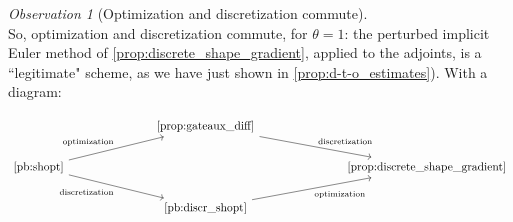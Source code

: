 \documentclass[english,a4paper,9pt,oneside]{scrbook}	%
\theoremstyle{break}
\theoremstyle{remark}
\newtheorem{obs}[equation]{Observation}
\begin{document}
\begin{obs}[Optimization and discretization commute]
\mbox{}\\
So, optimization and discretization commute, for $\theta=1$: the perturbed implicit Euler method of \cref{prop:discrete_shape_gradient}, applied to the adjoints, is a ``legitimate" scheme, as we have just shown in \cref{prop:d-t-o_estimates}).
With a diagram:

\[\begin{tikzcd}
	&&& \text{\cref{prop:gateaux_diff}} \\
	\text{\cref{pb:shopt}} &&&&&& \text{\cref{prop:discrete_shape_gradient}}  \\
	&&& \text{\cref{pb:discr_shopt}} 
	\arrow["{\text{optimization}}"', from=3-4, to=2-7]
	\arrow["{\text{discretization}}", from=1-4, to=2-7]
	\arrow["{\text{optimization}}", from=2-1, to=1-4]
	\arrow["{\text{discretization}}"', from=2-1, to=3-4]
\end{tikzcd}\]


\end{obs}



\end{document}
